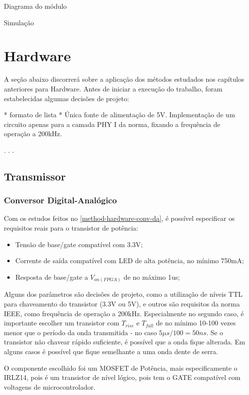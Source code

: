 	Diagrama do módulo
	
	Simulação
	
	\section{Hardware}
	A seção abaixo discorrerá sobre a aplicação dos métodos estudados nos capítulos anteriores para Hardware.
	Antes de iniciar a execução do trabalho, foram estabelecidas algumas decisões de projeto:
	
	* formato de lista *
	Única fonte de alimentação de 5V.
	Implementação de um circuito apenas para a camada PHY I da norma, fixando a frequência de operação a 200kHz.
	
	. . .
	
	
	\subsection{Transmissor}
	
	\subsubsection{Conversor Digital-Analógico}
		Com os estudos feitos no \autoref{method-hardware-conv-da}, é possível especificar os requisitos reais para o transistor de potência:

		\begin{itemize}
			\item Tensão de base/gate compatível com 3.3V;
			\item Corrente de saída compatível com LED de alta potência, no mínimo 750mA;
			\item Resposta de base/gate a $V_{on(FPGA)}$ de no máximo 1us;
		\end{itemize}
		
		Alguns dos parâmetros são decisões de projeto, como a utilização de níveis TTL para chaveamento do transistor (3.3V ou 5V), e outros são requisitos da norma IEEE, como frequência de operação a 200kHz. Especialmente no segundo caso, é importante escolher um transistor com $T_{rise}$ e $T_{fall}$ de no mínimo 10-100 vezes menor que o período da onda transmitida - no caso $5\mu$$s/100 = 50ns$. Se o transistor não chavear rápido suficiente, é possível que a onda fique alterada. Em alguns casos é possível que fique semelhante a uma onda dente de serra.
		
		O componente escolhido foi um MOSFET de Potência, mais especificamente o IRLZ14, pois é um transistor de nível lógico, pois tem o GATE compatível com voltagens de microcontrolador. 
		
